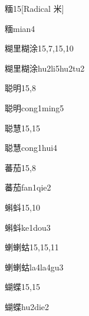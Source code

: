 \begin{entry}{糆}{15}[Radical 米]
  \begin{phonetics}{糆}{mian4}
  \end{phonetics}
\end{entry}

\begin{entry}{糊里糊涂}{15,7,15,10}
  \begin{phonetics}{糊里糊涂}{hu2li5hu2tu2}
  \end{phonetics}
\end{entry}

\begin{entry}{聪明}{15,8}
  \begin{phonetics}{聪明}{cong1ming5}
  \end{phonetics}
\end{entry}

\begin{entry}{聪慧}{15,15}
  \begin{phonetics}{聪慧}{cong1hui4}
  \end{phonetics}
\end{entry}

\begin{entry}{蕃茄}{15,8}
  \begin{phonetics}{蕃茄}{fan1qie2}
  \end{phonetics}
\end{entry}

\begin{entry}{蝌蚪}{15,10}
  \begin{phonetics}{蝌蚪}{ke1dou3}
  \end{phonetics}
\end{entry}

\begin{entry}{蝲蝲蛄}{15,15,11}
  \begin{phonetics}{蝲蝲蛄}{la4la4gu3}
  \end{phonetics}
\end{entry}

\begin{entry}{蝴蝶}{15,15}
  \begin{phonetics}{蝴蝶}{hu2die2}
  \end{phonetics}
\end{entry}

